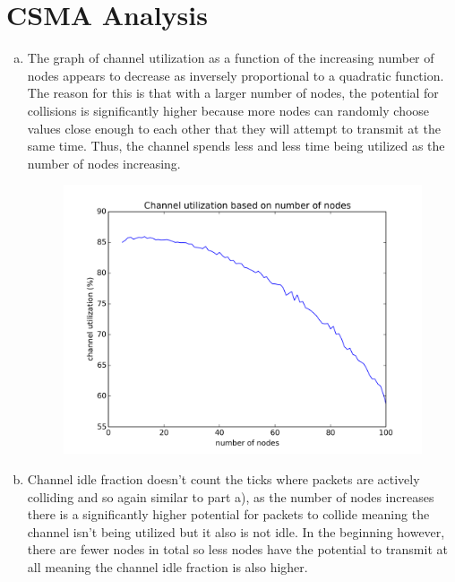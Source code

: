\documentclass[11pt]{article}
\begin{document}

\section*{CSMA Analysis}

\begin{enumerate}[a.]
\item The graph of channel utilization as a function of the increasing number of nodes appears to decrease as inversely proportional to a quadratic function. The reason for this is that with a larger number of nodes, the potential for collisions is significantly higher because more nodes can randomly choose values close enough to each other that they will attempt to transmit at the same time. Thus, the channel spends less and less time being utilized as the number of nodes increasing.

\begin{figure}[h]
\centering
\includegraphics[width=.9\textwidth]{partA.png}
\caption{}
\end{figure}

\newpage

\item Channel idle fraction doesn’t count the ticks where packets are actively colliding and so again similar to part a), as the number of nodes increases there is a significantly higher potential for packets to collide meaning the channel isn’t being utilized but it also is not idle. In the beginning however, there are fewer nodes in total so less nodes have the potential to transmit at all meaning the channel idle fraction is also higher.



\end{enumerate}
\end{document}
